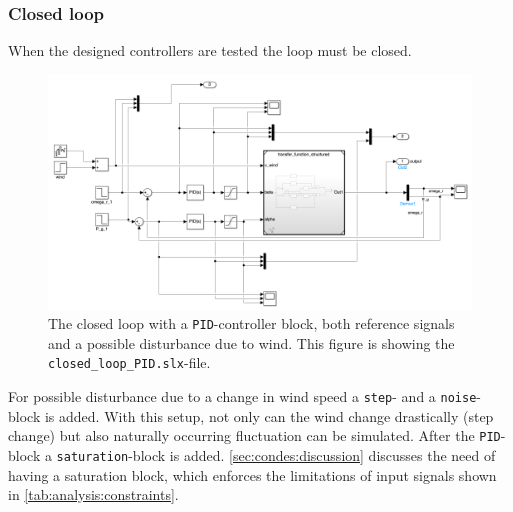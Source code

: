 \subsubsection*{Closed loop} \label{sec:condes:implementation_simulink:closed_loop}

When the designed controllers are tested the loop must be closed.

\begin{figure}[H]
    \center
    \includegraphics[width=1\textwidth,scale=1,trim=0 0 0 0,clip]{fig/Simulink/simulink_closed_loop.png}
    \caption{The closed loop with a \texttt{PID}-controller block, both reference signals and a possible disturbance due to wind. This figure is showing the \texttt{closed\_loop\_PID.slx}-file.}
    \label{fig:condes:implementation:closedloop}
\end{figure}

For possible disturbance due to a change in wind speed a \texttt{step}- and a \texttt{noise}-block is added.
With this setup, not only can the wind change drastically (step change) but also naturally occurring fluctuation can be simulated.
After the \texttt{PID}-block a \texttt{saturation}-block is added.
\autoref{sec:condes:discussion} discusses the need of having a saturation block, which enforces the limitations of input signals shown in \autoref{tab:analysis:constraints}.
